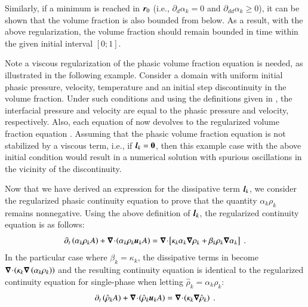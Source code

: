 Similarly, if a minimum is reached in $\boldsymbol r_0$ (i.e., $\partial_d \alpha_k = 0$ and $\partial_{dd} \alpha_k \geq 0$),
it can be shown that the volume fraction is also bounded from below. As a result, with the above regularization, the volume fraction
should remain bounded in time within the given initial interval $[0;1]$.
%
\begin{my_remark}\label{rmq:rmq_vf_diss_term}
Note a viscous regularization of the phasic volume fraction equation is needed, as illustrated in the following example. Consider a 
domain with uniform initial phasic pressure, velocity, temperature and an initial step discontinuity in the volume fraction. Under such conditions and using the definitions given in , 
the interfacial pressure and velocity are equal to the phasic pressure and velocity, respectively. Also, each equation of  now 
devolves to the regularized volume fraction equation . Assuming that the phasic volume fraction equation is not stabilized by a viscous term, 
i.e., if $\boldsymbol l_k = \boldsymbol0$, then this example case with the above initial condition would result in a numerical solution with spurious oscillations in the vicinity of the discontinuity. 
\end{my_remark}
%
Now that we have derived an expression for the dissipative term $\boldsymbol l_k$, we consider the regularized phasic continuity equation to prove that the quantity 
$\alpha_k \rho_k$ remains nonnegative. Using the above definition of $\boldsymbol l_k$, the regularized continuity equation is as follows:
%
\begin{equation}\label{eq:reg-mass-equ-final}
\partial_t \left( \alpha_k \rho_k A \right) + \boldsymbol\nabla\! \cdot \! \left( \alpha_k \rho_k \boldsymbol u_k A \right) = \boldsymbol\nabla\! \cdot \! \left[ \kappa_k \alpha_k \boldsymbol\nabla \rho_k + \beta_k \rho_k \boldsymbol\nabla \alpha_k \right] \ .
\end{equation}
%
In the particular case where $\beta_k = \kappa_k$, the dissipative terms in  become $\boldsymbol\nabla\! \cdot \! \left( \kappa_k \boldsymbol\nabla \left( \alpha_k \rho_k \right) \right)$ 
and the resulting continuity equation is identical to the regularized continuity equation for single-phase when letting $\hat{\rho}_k = \alpha_k \rho_k$:
%
\begin{equation}\label{eq:reg-euler-qu}
\partial_t \left( \hat{\rho}_k A \right) + \div \left( \hat{\rho}_k \mbold u_k A \right) = \div \left( \kappa_k \grad \hat{\rho}_k \right) \ .
\end{equation}
